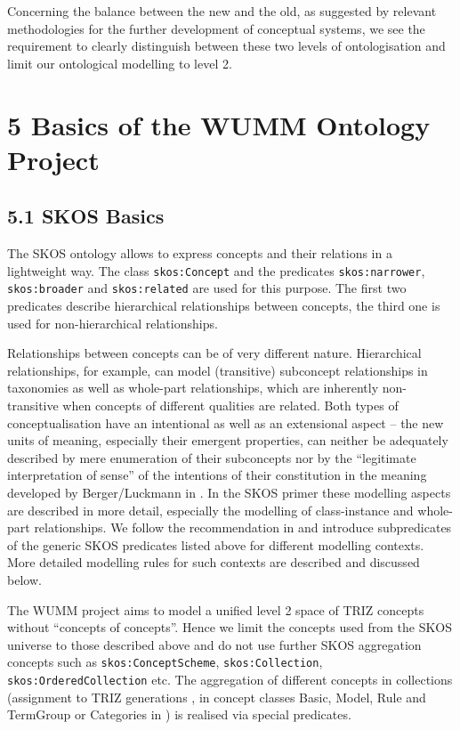 \documentclass[12pt,a4paper]{article}
\begin{document}
Concerning the balance between the new and the old, as suggested by relevant
methodologies for the further development of conceptual systems, we see the
requirement to clearly distinguish between these two levels of ontologisation
and limit our ontological modelling to level 2.

\section*{5 Basics of the WUMM Ontology Project}

\subsection*{5.1 SKOS Basics}

The SKOS ontology \cite{19,20} allows to express concepts and their relations
in a lightweight way. The class \texttt{skos:Concept} and the predicates
\texttt{skos:narrower}, \texttt{skos:broader} and \texttt{skos:related} are
used for this purpose. The first two predicates describe hierarchical
relationships between concepts, the third one is used for non-hierarchical
relationships.

Relationships between concepts can be of very different nature.  Hierarchical
relationships, for example, can model (transitive) subconcept relationships in
taxonomies as well as whole-part relationships, which are inherently
non-transitive when concepts of different qualities are related. Both types of
conceptualisation have an intentional as well as an extensional aspect – the
new units of meaning, especially their emergent properties, can neither be
adequately described by mere enumeration of their subconcepts nor by the
“legitimate interpretation of sense” of the intentions of their constitution
in the meaning developed by Berger/Luckmann in \cite{2}. In the SKOS primer
\cite{20} these modelling aspects are described in more detail, especially the
modelling of class-instance and whole-part relationships. We follow the
recommendation in \cite[sect. 4.7]{20} and introduce subpredicates of the
generic SKOS predicates listed above for different modelling contexts.  More
detailed modelling rules for such contexts are described and discussed below.

The WUMM project aims to model a unified level 2 space of TRIZ concepts
without “concepts of concepts”. Hence we limit the concepts used from the SKOS
universe to those described above and do not use further SKOS aggregation
concepts such as \texttt{skos:Concept\-Scheme}, \texttt{skos:Collection},
\texttt{skos:OrderedCollection} etc. The aggregation of different concepts in
collections (assignment to TRIZ generations \cite[Table 1]{12}, in concept
classes Basic, Model, Rule and TermGroup \cite[Fig. 4]{12} or Categories in
\cite{21}) is realised via special predicates.
\end{document}

